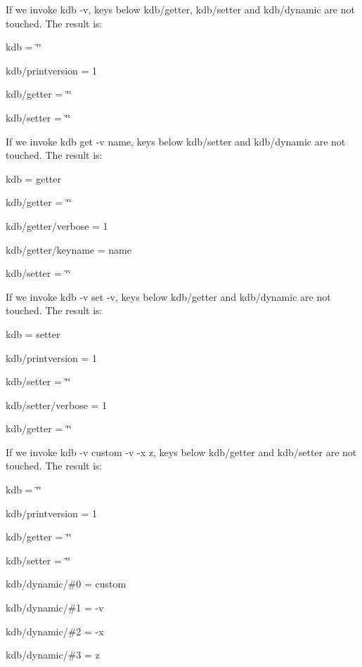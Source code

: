 \begin{DoxyItemize}
\item If we invoke {\ttfamily kdb -\/v}, keys below {\ttfamily kdb/getter}, {\ttfamily kdb/setter} and {\ttfamily kdb/dynamic} are not touched. The result is\+:
\begin{DoxyItemize}
\item {\ttfamily kdb = \char`\"{}\char`\"{}}
\item {\ttfamily kdb/printversion = 1}
\item {\ttfamily kdb/getter = \char`\"{}\char`\"{}}
\item {\ttfamily kdb/setter = \char`\"{}\char`\"{}}
\end{DoxyItemize}
\item If we invoke {\ttfamily kdb get -\/v name}, keys below {\ttfamily kdb/setter} and {\ttfamily kdb/dynamic} are not touched. The result is\+:
\begin{DoxyItemize}
\item {\ttfamily kdb = getter}
\item {\ttfamily kdb/getter = \char`\"{}\char`\"{}}
\item {\ttfamily kdb/getter/verbose = 1}
\item {\ttfamily kdb/getter/keyname = name}
\item {\ttfamily kdb/setter = \char`\"{}\char`\"{}}
\end{DoxyItemize}
\item If we invoke {\ttfamily kdb -\/v set -\/v}, keys below {\ttfamily kdb/getter} and {\ttfamily kdb/dynamic} are not touched. The result is\+:
\begin{DoxyItemize}
\item {\ttfamily kdb = setter}
\item {\ttfamily kdb/printversion = 1}
\item {\ttfamily kdb/setter = \char`\"{}\char`\"{}}
\item {\ttfamily kdb/setter/verbose = 1}
\item {\ttfamily kdb/getter = \char`\"{}\char`\"{}}
\end{DoxyItemize}
\item If we invoke {\ttfamily kdb -\/v custom -\/v -\/x z}, keys below {\ttfamily kdb/getter} and {\ttfamily kdb/setter} are not touched. The result is\+:
\begin{DoxyItemize}
\item {\ttfamily kdb = \char`\"{}\char`\"{}}
\item {\ttfamily kdb/printversion = 1}
\item {\ttfamily kdb/getter = \char`\"{}\char`\"{}}
\item {\ttfamily kdb/setter = \char`\"{}\char`\"{}}
\item {\ttfamily kdb/dynamic/\#0 = custom}
\item {\ttfamily kdb/dynamic/\#1 = -\/v}
\item {\ttfamily kdb/dynamic/\#2 = -\/x}
\item {\ttfamily kdb/dynamic/\#3 = z}
\end{DoxyItemize}
\end{DoxyItemize}


